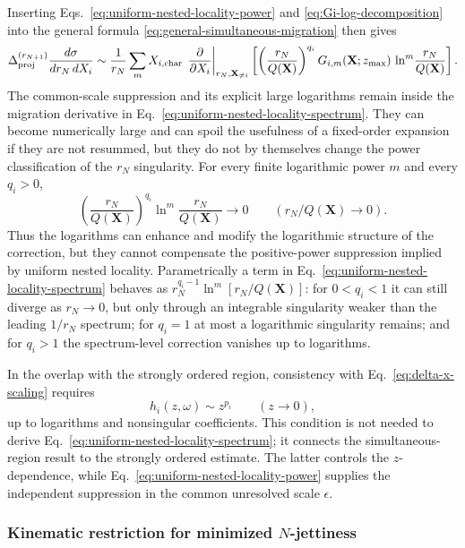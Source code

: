 \documentclass[11pt]{article}
\newcommand{\rn}{r_N}
\newcommand{\rnp}{r_{N+1}}
\begin{document}
Inserting Eqs.~\eqref{eq:uniform-nested-locality-power} and \eqref{eq:Gi-log-decomposition} into the general
formula \eqref{eq:general-simultaneous-migration} then gives
\begin{equation}
\Delta_{\rm proj}^{(\rnp)}
\frac{d\sigma}{d\rn\,dX_i}
\sim
\frac{1}{\rn}
\sum_m
X_{i,\rm char}\,
\left.
\frac{\partial}{\partial X_i}
\right|_{\rn,\mathbf X_{\neq i}}
\left[
\left(\frac{\rn}{Q(\mathbf X)}\right)^{q_i}
G_{i,m}(\mathbf X;z_{\max})\,
\ln^m\!\frac{\rn}{Q(\mathbf X)}
\right].
\label{eq:uniform-nested-locality-spectrum}
\end{equation}
The common-scale suppression and its explicit large logarithms remain inside the migration derivative in
Eq.~\eqref{eq:uniform-nested-locality-spectrum}. They can become numerically large and can spoil the usefulness
of a fixed-order expansion if they are not resummed, but they do not by themselves change the power
classification of the \(\rn\) singularity. For every finite logarithmic power \(m\) and every \(q_i>0\),
\[
\left(\frac{\rn}{Q(\mathbf X)}\right)^{q_i}
\ln^m\!\frac{\rn}{Q(\mathbf X)}
\longrightarrow0
\qquad (\rn/Q(\mathbf X)\to0).
\]
Thus the logarithms can enhance and modify the logarithmic structure of the correction, but they cannot
compensate the positive-power suppression implied by uniform nested locality. Parametrically a term in
Eq.~\eqref{eq:uniform-nested-locality-spectrum} behaves as
\(\rn^{q_i-1}\ln^m[\rn/Q(\mathbf X)]\): for \(0<q_i<1\) it can still diverge as \(\rn\to0\), but only
through an integrable singularity weaker than the leading \(1/\rn\) spectrum; for \(q_i=1\) at most a
logarithmic singularity remains; and for \(q_i>1\) the spectrum-level correction vanishes up to logarithms.

In the overlap with the strongly ordered region, consistency with Eq.~\eqref{eq:delta-x-scaling} requires
\begin{equation}
h_i(z,\omega)\sim z^{p_i}
\qquad (z\to0),
\label{eq:uniform-nested-strong-overlap}
\end{equation}
up to logarithms and nonsingular coefficients. This condition is not needed to derive
Eq.~\eqref{eq:uniform-nested-locality-spectrum}; it connects the simultaneous-region result to the
strongly ordered estimate. The latter controls the \(z\)-dependence, while
Eq.~\eqref{eq:uniform-nested-locality-power} supplies the independent suppression in the common unresolved
scale \(\epsilon\).


\subsubsection{Kinematic restriction for minimized \(N\)-jettiness}
\end{document}

